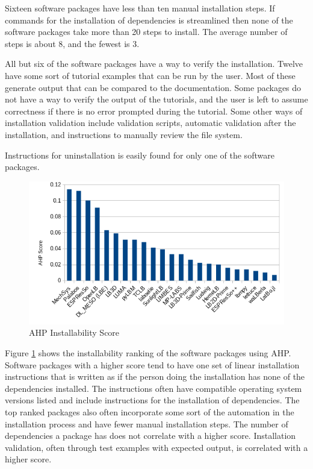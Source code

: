 \documentclass[12pt, notitlepage]{article}
\begin{document}
Sixteen software packages have less than ten manual installation steps. If commands for the installation of dependencies is streamlined then none of the software packages take more than 20 steps to install. The average number of steps is about 8, and the fewest is 3. 

All but six of the software packages have a way to verify the installation. Twelve have some sort of tutorial examples that can be run by the user. Most of these generate output that can be compared to the documentation. Some packages do not have a way to verify the output of the tutorials, and the user is left to assume correctness if there is no error prompted during the tutorial. Some other ways of installation validation include validation scripts, automatic validation after the installation, and instructions to manually review the file system. 

Instructions for uninstallation is easily found for only one of the software packages.

\begin{figure}[h!]
	\begin{center}
		\includegraphics[width=1.0\textwidth]{installability_chart}
		\caption{AHP Installability Score}
		\label{Fig_Installability}
	\end{center}
\end{figure}

Figure \ref{Fig_Installability} shows the installability ranking of the software packages using AHP. Software packages with a higher score tend to have one set of linear installation instructions that is written as if the person doing the installation has none of the dependencies installed. The instructions often have compatible operating system versions listed and include instructions for the installation of dependencies. The top ranked packages also often incorporate some sort of the automation in the installation process and have fewer manual installation steps. The number of dependencies a package has does not correlate with a higher score. Installation validation, often through test examples with expected output, is correlated with a higher score.
\end{document}
